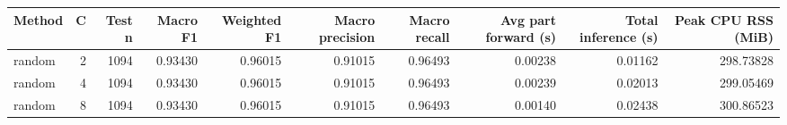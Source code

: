 \begin{tabular}{lrrrrrrrrr}
\toprule
Method & C & Test n & Macro F1 & Weighted F1 & Macro precision & Macro recall & Avg part forward (s) & Total inference (s) & Peak CPU RSS (MiB) \\
\midrule
random & 2 & 1094 & 0.93430 & 0.96015 & 0.91015 & 0.96493 & 0.00238 & 0.01162 & 298.73828 \\
random & 4 & 1094 & 0.93430 & 0.96015 & 0.91015 & 0.96493 & 0.00239 & 0.02013 & 299.05469 \\
random & 8 & 1094 & 0.93430 & 0.96015 & 0.91015 & 0.96493 & 0.00140 & 0.02438 & 300.86523 \\
\bottomrule
\end{tabular}
